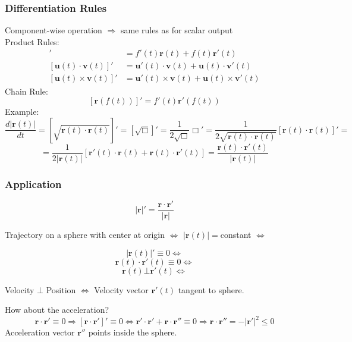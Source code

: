 \begin{frame}
  \frametitle{Differentiation Rules}
  Component-wise operation $\Longrightarrow$ same rules as for scalar output\\
  \pause Product Rules:
   \begin{align*}
   [f(t) \textbf{r}(t)]' & = f'(t) \textbf{r}(t) + f(t) \textbf{r}'(t) \\
   [\textbf{u}(t)\cdot \textbf{v}(t)]' & = \textbf{u}'(t)\cdot \textbf{v}(t) + \textbf{u}(t)
\cdot \textbf{v}'(t) \\
   [\textbf{u}(t)\times \textbf{v}(t)]' & = \textbf{u}'(t) \times \textbf{v}(t) +
\textbf{u}(t)\times \textbf{v}'(t)
 \end{align*}
  \pause Chain Rule:
  $$[\textbf{r}(f(t))]' = f'(t) \textbf{r}'(f(t))$$
    \pause Example:
    $$\frac{d |\textbf{r}(t)|}{dt} =
    [\sqrt{\textbf{r}(t)\cdot \textbf{r}(t)}]' = [\sqrt{\Box}]' =
    \frac{1}{2\sqrt{\Box}} \Box' =
    \frac{1}{2\sqrt{\textbf{r}(t)\cdot \textbf{r}(t)}}
    [\textbf{r}(t)\cdot \textbf{r}(t)]' = $$
    $$= \frac{1}{2|\textbf{r}(t)|}
    [\textbf{r}'(t)\cdot \textbf{r}(t) +
    \textbf{r}(t)\cdot \textbf{r}'(t)] = \frac{\textbf{r}(t)\cdot \textbf{r}'(t)}{|\textbf{r}(t)|}$$
\end{frame}

\begin{frame}
  \frametitle{Application}
  $$|\textbf{r}|' = \frac{\textbf{r} \cdot \textbf{r}'}{|\textbf{r}|}$$

  Trajectory on a sphere with center at origin $\Longleftrightarrow$ $|\textbf{r}(t)| = $constant \pause $\Longleftrightarrow$

  $$|\textbf{r}(t)|'\equiv0 \Longleftrightarrow$$
  $$\textbf{r}(t)\cdot \textbf{r}'(t)\equiv 0 \Longleftrightarrow$$
  $$\textbf{r}(t) \bot \textbf{r}'(t) \Longleftrightarrow$$

  \pause Velocity  $\bot$ Position  $\Longleftrightarrow$ Velocity vector $\textbf{r}'(t)$ tangent to sphere.

  \bigskip

  How about the acceleration?\pause
  $$\textbf{r}\cdot \textbf{r}'\equiv 0 \Longrightarrow [\textbf{r}\cdot \textbf{r}']'\equiv 0 \Longleftrightarrow
  \textbf{r}'\cdot \textbf{r}'+\textbf{r}\cdot \textbf{r}'' \equiv 0 \Longrightarrow \textbf{r}\cdot \textbf{r}'' = -|\textbf{r}'|^2 \leqslant 0$$
  Acceleration vector $\textbf{r}''$ points inside the sphere.
\end{frame}

